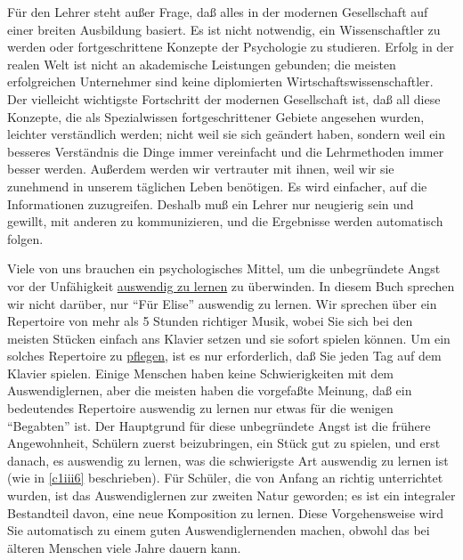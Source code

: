 Für den Lehrer steht außer Frage, daß alles in der modernen Gesellschaft auf einer breiten Ausbildung basiert.
Es ist nicht notwendig, ein Wissenschaftler zu werden oder fortgeschrittene Konzepte der Psychologie zu studieren.
Erfolg in der realen Welt ist nicht an akademische Leistungen gebunden; die meisten erfolgreichen Unternehmer sind keine diplomierten Wirtschaftswissenschaftler.
Der vielleicht wichtigste Fortschritt der modernen Gesellschaft ist, daß all diese Konzepte, die als Spezialwissen fortgeschrittener Gebiete angesehen wurden, leichter verständlich werden; nicht weil sie sich geändert haben, sondern weil ein besseres Verständnis die Dinge immer vereinfacht und die Lehrmethoden immer besser werden.
Außerdem werden wir vertrauter mit ihnen, weil wir sie zunehmend in unserem täglichen Leben benötigen.
Es wird einfacher, auf die Informationen zuzugreifen.
Deshalb muß ein Lehrer nur neugierig sein und gewillt, mit anderen zu kommunizieren, und die Ergebnisse werden automatisch folgen.

Viele von uns brauchen ein psychologisches Mittel, um die unbegründete Angst vor der Unfähigkeit \hyperref[c1iii6]{auswendig zu lernen} zu überwinden.
In diesem Buch sprechen wir nicht darüber, nur \enquote{Für Elise} auswendig zu lernen.
Wir sprechen über ein Repertoire von mehr als 5 Stunden richtiger Musik, wobei Sie sich bei den meisten Stücken einfach ans Klavier setzen und sie sofort spielen können.
Um ein solches Repertoire zu \hyperref[c1iii6k]{pflegen}, ist es nur erforderlich, daß Sie jeden Tag auf dem Klavier spielen.
Einige Menschen haben keine Schwierigkeiten mit dem Auswendiglernen, aber die meisten haben die vorgefaßte Meinung, daß ein bedeutendes Repertoire auswendig zu lernen nur etwas für die wenigen \enquote{Begabten} ist.
Der Hauptgrund für diese unbegründete Angst ist die frühere Angewohnheit, Schülern zuerst beizubringen, ein Stück gut zu spielen, und erst danach, es auswendig zu lernen, was die schwierigste Art auswendig zu lernen ist (wie in \autoref{c1iii6} beschrieben).
Für Schüler, die von Anfang an richtig unterrichtet wurden, ist das Auswendiglernen zur zweiten Natur geworden; es ist ein integraler  Bestandteil davon, eine neue Komposition zu lernen.
Diese Vorgehensweise wird Sie automatisch zu einem guten Auswendiglernenden machen, obwohl das bei älteren Menschen viele Jahre dauern kann.

